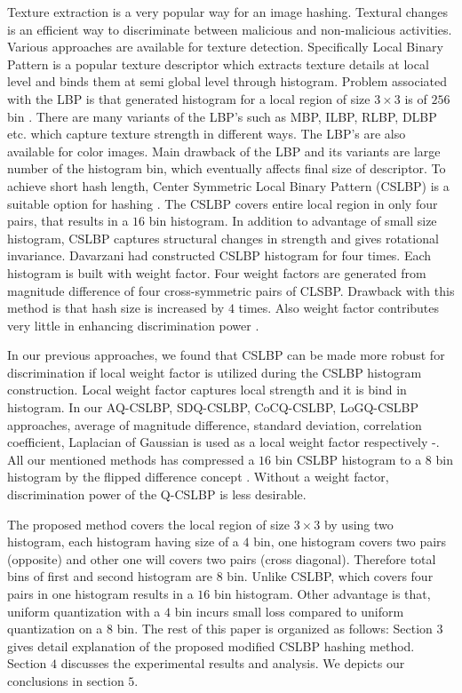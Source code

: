 \documentclass[12pt,a4paper]{jihmsp}
\begin{document}
{{Texture extraction is a very popular way for an image hashing. Textural changes is an efficient way to discriminate between malicious and non-malicious activities. Various approaches are available for texture detection. Specifically Local Binary Pattern is a popular texture descriptor which extracts texture details at local level and binds them at semi global level through histogram. Problem associated with the LBP is that generated histogram for a local region of size $3\times3$ is of $256$ bin \cite{ojala2002}. There are many variants of the LBP's such as MBP, ILBP, RLBP, DLBP etc. which capture texture strength in different ways. The LBP's are also available for color images. Main drawback of the LBP and its variants are large number of the histogram bin, which eventually affects final size of descriptor. To achieve short hash length, Center Symmetric Local Binary Pattern (CSLBP) is a suitable option for hashing \cite{xiao2011}. The CSLBP covers entire local region in only four pairs, that results in a $16$ bin histogram. In addition to advantage of small size histogram, CSLBP captures structural changes in strength and gives rotational invariance. Davarzani had constructed CSLBP histogram for four times. Each histogram is built with weight factor. Four weight factors are generated from magnitude difference of four cross-symmetric pairs of CLSBP. Drawback with this method is that hash size is increased by $4$ times. Also weight factor contributes very little in enhancing discrimination power \cite{davarzani2015}.
\par
In our previous approaches, we found that CSLBP can be made more robust for discrimination if local weight factor is utilized during the CSLBP histogram construction. Local weight factor captures local strength and it is bind in histogram. In our AQ-CSLBP, SDQ-CSLBP, CoCQ-CSLBP, LoGQ-CSLBP approaches, average of magnitude difference, standard deviation, correlation coefficient, Laplacian of Gaussian is used as a local weight factor respectively \cite{patil2016a}-\cite{patil2016d}. All our mentioned methods has compressed a $16$ bin CSLBP histogram to a $8$ bin histogram by the flipped difference concept \cite{baber2012}. Without a weight factor, discrimination power of the Q-CSLBP is less desirable. 
\par
The proposed method covers the local region of size $3\times3$ by using two histogram, each histogram having size of a $4$ bin, one histogram covers two pairs (opposite) and other one will covers two pairs (cross diagonal). Therefore total bins of first and second histogram are $8$ bin. Unlike CSLBP, which covers four pairs in one histogram results in a $16$ bin histogram. Other advantage is that, uniform quantization with a $4$ bin incurs small loss compared to uniform quantization on a $8$ bin. The rest of this paper is organized as follows: Section $3$ gives detail explanation of the  proposed modified CSLBP hashing method. Section $4$ discusses the experimental results and analysis. We depicts our conclusions in section $5$.

}}
\end{document}
